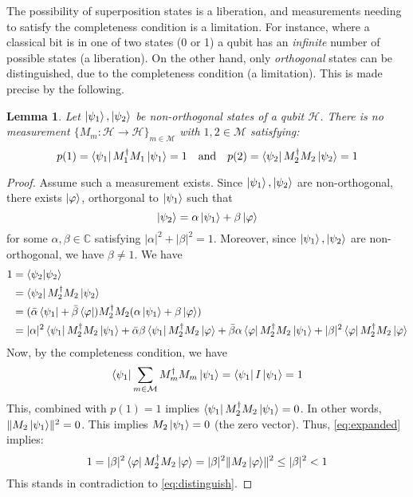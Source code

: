 \documentclass[12pt]{article}
\theoremstyle{plain}
\newtheorem{lemma}[thm]{Lemma}
\theoremstyle{definition}
\newcommand{\bb}[1]{\mathbb{#1}}
\newcommand{\call}[1]{\mathcal{#1}}
\newcommand{\lto}{\longrightarrow}
\begin{document}
The possibility of superposition states is a liberation, and measurements needing to satisfy the completeness condition is a limitation. For instance, where a classical bit is in one of two states (0 or 1) a qubit has an \emph{infinite} number of possible states (a liberation). On the other hand, only \emph{orthogonal} states can be distinguished, due to the completeness condition (a limitation). This is made precise by the following.

\begin{lemma}\label{lem:nonorthogonal_indistinguishability}
	Let $\ket{\psi_1}, \ket{\psi_2}$ be non-orthogonal states of a qubit $\call{H}$. There is no measurement $\{ M_m: \call{H} \lto \call{H} \}_{m \in \call{M}}$ with $1,2 \in \call{M}$ satisfying:
	\begin{equation}\label{eq:distinguish}
		p(1) = \bra{\psi_1} M_{1}^\dagger M_1\ket{\psi_1} = 1\quad \text{and}\quad p(2) = \bra{\psi_2} M_2^\dagger M_2\ket{\psi_2} = 1
		\end{equation}
	\end{lemma}
\begin{proof}
	Assume such a measurement exists. Since $\ket{\psi_1}, \ket{\psi_2}$ are non-orthogonal, there exists $\ket{\varphi}$, orthorgonal to $\ket{\psi_1}$ such that
	\begin{equation}
		\ket{\psi_2} = \alpha \ket{\psi_1} + \beta \ket{\varphi}
		\end{equation}
	for some $\alpha, \beta \in \bb{C}$ satisfying $|\alpha|^2 + |\beta|^2 = 1$. Moreover, since $\ket{\psi_1}, \ket{\psi_2}$ are non-orthogonal, we have $\beta \neq 1$. We have
	\begin{align}
		1 &= \bra{\psi_2}\ket{\psi_2}\\
		&= \bra{\psi_2} M_2^\dagger M_2 \ket{\psi_2}\\
		&= (\bar{\alpha}\bra{\psi_1} + \bar{\beta}\bra{\varphi})M_2^\dagger M_2(\alpha \ket{\psi_1} + \beta \ket{\varphi})\\
		&\label{eq:expanded}= |\alpha|^2\bra{\psi_1}M_2^\dagger M_2\ket{\psi_1} + \bar{\alpha}\beta \bra{\psi_1}M_2^\dagger M_2 \ket{\varphi} + \bar{\beta}\alpha\bra{\varphi}M_2^\dagger M_2\ket{\psi_1} + |\beta|^2 \bra{\varphi}M_2^\dagger M_2\ket{\varphi}
		\end{align}
	Now, by the completeness condition, we have
	\begin{equation}
		\bra{\psi_1} \sum_{m \in \call{M}}M_m^\dagger M_m\ket{\psi_1} = \bra{\psi_1} I \ket{\psi_1} = 1
		\end{equation}
	This, combined with $p(1) = 1$ implies $\bra{\psi_1} M_2^\dagger M_2 \ket{\psi_1} = 0$. In other words, $\lVert M_2 \ket{\psi_1} \rVert^2 = 0$. This implies $M_2\ket{\psi_1} = 0$ (the zero vector). Thus, \eqref{eq:expanded} implies:
	\begin{equation}
		1 = |\beta|^2 \bra{\varphi} M_2^\dagger M_2 \ket{\varphi} = |\beta|^2 \lVert M_2 \ket{\varphi}\rVert^2 \leq |\beta|^2 < 1
		\end{equation}
	This stands in contradiction to \eqref{eq:distinguish}.
	\end{proof}
\end{document}
